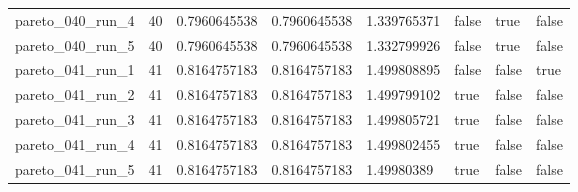 \begin{tabular}{@{}llllllll@{}}
pareto\_040\_run\_4 & 40 & 0.7960645538 & 0.7960645538 & 1.339765371 & false & true & false \\
pareto\_040\_run\_5 & 40 & 0.7960645538 & 0.7960645538 & 1.332799926 & false & true & false \\
pareto\_041\_run\_1 & 41 & 0.8164757183 & 0.8164757183 & 1.499808895 & false & false & true \\
pareto\_041\_run\_2 & 41 & 0.8164757183 & 0.8164757183 & 1.499799102 & true & false & false \\
pareto\_041\_run\_3 & 41 & 0.8164757183 & 0.8164757183 & 1.499805721 & true & false & false \\
pareto\_041\_run\_4 & 41 & 0.8164757183 & 0.8164757183 & 1.499802455 & true & false & false \\
pareto\_041\_run\_5 & 41 & 0.8164757183 & 0.8164757183 & 1.49980389 & true & false & false \\
\bottomrule
\end{tabular}
